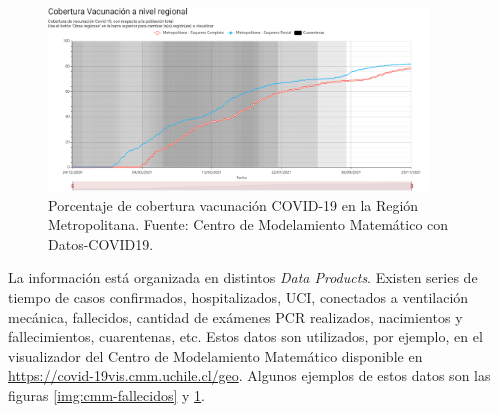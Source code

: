 \begin{figure}[H]
\centering
\includegraphics[width=0.9\textwidth]{img/metodologia/datos/CoberturaVacunacionRM.png}
\caption{Porcentaje de cobertura vacunación COVID-19 en la Región Metropolitana. Fuente: Centro de Modelamiento Matemático con Datos-COVID19.}
\label{img:cmm-vacunados}
\end{figure}

La información está organizada en distintos \textit{Data Products}. Existen series de tiempo de casos confirmados, hospitalizados, UCI, conectados a ventilación mecánica, fallecidos, cantidad de exámenes PCR realizados, nacimientos y fallecimientos, cuarentenas, etc. Estos datos son utilizados, por ejemplo, en el visualizador del Centro de Modelamiento Matemático disponible en \url{https://covid-19vis.cmm.uchile.cl/geo}. Algunos ejemplos de estos datos son las figuras \ref{img:cmm-fallecidos} y \ref{img:cmm-vacunados}.
